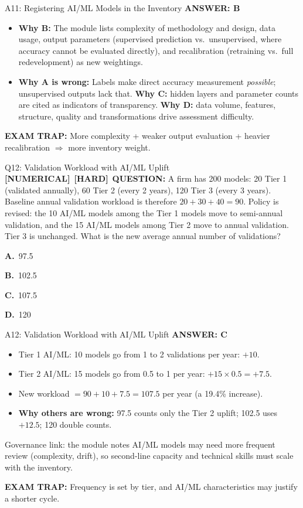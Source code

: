 \documentclass[8pt]{beamer}
\newcommand{\fs}{\fontsize{10}{12}\selectfont}
\newcommand{\opts}[4]{\par\vspace{0.12cm}\noindent\textbf{A.}~#1\par\vspace{0.08cm}\noindent\textbf{B.}~#2\par\vspace{0.08cm}\noindent\textbf{C.}~#3\par\vspace{0.08cm}\noindent\textbf{D.}~#4\par}
\newcommand{\ans}[1]{\textcolor{myblue}{\textbf{ANSWER: #1}}}
\newcommand{\trap}[1]{\textcolor{myred}{\textbf{EXAM TRAP:}} #1}
\newcommand{\numtag}{\textcolor{mypurple}{\textbf{[NUMERICAL]}}}
\newcommand{\hard}{\textcolor{myorange}{\textbf{[HARD]}}}
\begin{document}
\begin{frame}[t]{A11: Registering AI/ML Models in the Inventory}
\fs
\ans{B}
\begin{itemize}
\item \textbf{Why B:} The module lists complexity of methodology and design, data usage, output parameters (supervised prediction vs.\ unsupervised, where accuracy cannot be evaluated directly), and recalibration (retraining vs.\ full redevelopment) as new weightings.
\item \textbf{Why A is wrong:} Labels make direct accuracy measurement \emph{possible}; unsupervised outputs lack that. \textbf{Why C:} hidden layers and parameter counts are cited as indicators of transparency. \textbf{Why D:} data volume, features, structure, quality and transformations drive assessment difficulty.
\end{itemize}
\trap{More \textcolor{myblue}{complexity + weaker output evaluation + heavier recalibration} $\Rightarrow$ more inventory weight.}
\end{frame}

\begin{frame}[t]{Q12: Validation Workload with AI/ML Uplift}
\fs
\numtag\ \hard\ \textbf{QUESTION:} A firm has 200 models: 20 Tier 1 (validated annually), 60 Tier 2 (every 2 years), 120 Tier 3 (every 3 years). Baseline annual validation workload is therefore $20+30+40=90$. Policy is revised: the 10 AI/ML models among the Tier 1 models move to semi-annual validation, and the 15 AI/ML models among Tier 2 move to annual validation. Tier 3 is unchanged. What is the new average annual number of validations?
\opts{97.5}{102.5}{107.5}{120}
\end{frame}

\begin{frame}[t]{A12: Validation Workload with AI/ML Uplift}
\fs
\ans{C}
\begin{itemize}
\item Tier 1 AI/ML: 10 models go from 1 to 2 validations per year: $+10$.
\item Tier 2 AI/ML: 15 models go from 0.5 to 1 per year: $+15\times0.5=+7.5$.
\item New workload $=90+10+7.5=\mathbf{107.5}$ per year (a 19.4\% increase).
\item \textbf{Why others are wrong:} 97.5 counts only the Tier 2 uplift; 102.5 uses $+12.5$; 120 double counts.
\end{itemize}
\textcolor{myblue}{Governance link:} the module notes AI/ML models may need more frequent review (complexity, drift), so second-line capacity and technical skills must scale with the inventory.

\trap{Frequency is set by \textcolor{myblue}{tier}, and AI/ML characteristics may justify a \textcolor{myblue}{shorter} cycle.}
\end{frame}
\end{document}
